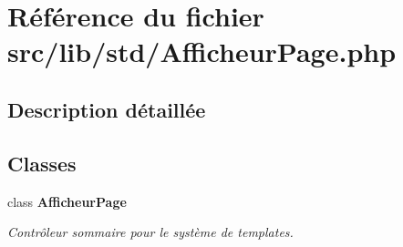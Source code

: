 \section{Référence du fichier src/lib/std/AfficheurPage.php}
\label{_afficheur_page_8php}


\subsection{Description détaillée}


\subsection*{Classes}
\begin{CompactItemize}
\item 
class {\bf AfficheurPage}
\begin{CompactList}\small\item\em Contrôleur sommaire pour le système de templates. \item\end{CompactList}\end{CompactItemize}
